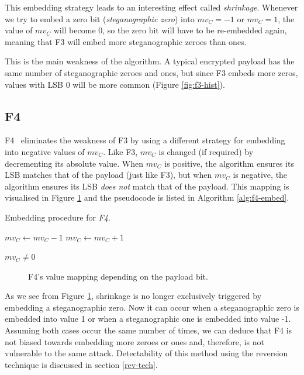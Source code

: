 \documentclass[12pt,british,twoside,notitlepage,usenames,dvipsnames,hypens,final]{report}
\numberwithin{equation}{section}
\numberwithin{figure}{section}
\begin{document}
This embedding strategy leads to an interesting effect called \emph{shrinkage}. Whenever we try to embed a zero bit (\emph{steganographic zero}) into $mv_C = -1$ or $mv_C = 1$, the value of $mv_C$ will become 0, so the zero bit will have to be re-embedded again, meaning that F3 will embed more steganographic zeroes than ones. 

This is the main weakness of the algorithm. A typical encrypted payload has the same number of steganographic zeroes and ones, but since F3 embeds more zeros, values with LSB 0 will be more common (Figure \ref{fig:f3-hist}). 

\subsection{F4}
\label{f4}

F4~\cite{f5} eliminates the weakness of F3 by using a different strategy for embedding into negative values of $mv_C$. Like F3, $mv_C$ is changed (if required) by decrementing its absolute value. When $mv_C$ is positive, the algorithm ensures its LSB matches that of the payload (just like F3), but when $mv_C$ is negative, the algorithm ensures its LSB \emph{does not} match that of the payload. This mapping is visualised in Figure \ref{fig:f4-mapping} and the pseudocode is listed in Algorithm \ref{alg:f4-embed}.

\begin{algorithm}
\caption{Embedding procedure for \emph{F4}.}
\label{alg:f4-embed}
\begin{algorithmic}
    \State $mv_C \gets mv_C - 1$ 
\EndIf
{}
	\State $mv_C \gets mv_C + 1$ 
\EndIf

\State \Return $mv_C \neq 0$
\EndProcedure
\end{algorithmic}
\end{algorithm}

\begin{figure}[tbh]
\centering
\resizebox{0.75\textwidth}{!}{}
\caption{F4's value mapping depending on the payload bit.}
\label{fig:f4-mapping}
\end{figure}

As we see from Figure \ref{fig:f4-mapping}, shrinkage is no longer exclusively triggered by embedding a steganographic zero. Now it can occur when a steganographic zero is embedded into value 1 or when a steganographic one is embedded into value -1. Assuming both cases occur the same number of times, we can deduce that F4 is not biased towards embedding more zeroes or ones and, therefore, is not vulnerable to the same attack. Detectability of this method using the reversion technique is discussed in section \ref{rev-tech}.
\end{document}
